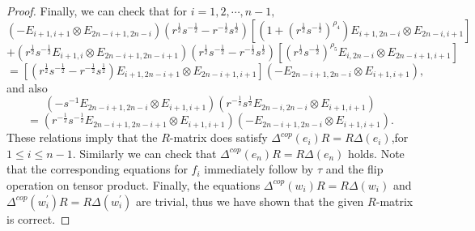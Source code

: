 \documentclass[10pt,a4paper]{amsart}
\begin{document}
\begin{proof}
 Finally, we can check that for $i=1,2, \cdots ,n-1,$
$$
\left(-E_{i+1, i+1} \otimes E_{2 n-i+1,2 n-i}\right)\left(r^{\frac{1}{2}} s^{-\frac{1}{2}}-r^{-\frac{1}{2}} s^{\frac{1}{2}}\right)\left[\left(1+\left(r^{\frac{1}{2}} s^{-\frac{1}{2}}\right)^{\rho_4}\right) E_{i+1,2 n-i} \otimes E_{2 n-i, i+1}\right]
$$
$$
+\left(r^{\frac{1}{2}} s^{-\frac{1}{2}} E_{i+1, i} \otimes E_{2 n-i+1,2 n-i+1}\right)\left(r^{\frac{1}{2}} s^{-\frac{1}{2}}-r^{-\frac{1}{2}} s^{\frac{1}{2}}\right)\left[\left(r^{\frac{1}{2}} s^{-\frac{1}{2}}\right)^{\rho_5} E_{i, 2 n-i} \otimes E_{2 n-i+1, i+1}\right]
$$
$$
=\left[\left(r^{\frac{1}{2}} s^{-\frac{1}{2}}-r^{-\frac{1}{2}} s^{\frac{1}{2}}\right) E_{i+1,2 n-i+1} \otimes E_{2 n-i+1, i+1}\right]\left(-E_{2 n-i+1,2 n-i} \otimes E_{i+1, i+1}\right),
$$
and also
$$
\left(-s^{-1} E_{2 n-i+1,2 n-i} \otimes E_{i+1, i+1}\right)\left(r^{-\frac{1}{2}} s^{\frac{1}{2}} E_{2 n-i, 2 n-i} \otimes E_{i+1, i+1}\right)
$$
$$
=\left(r^{-\frac{1}{2}} s^{-\frac{1}{2}} E_{2 n-i+1,2 n-i+1} \otimes E_{i+1, i+1}\right)\left(-E_{2 n-i+1,2 n-i} \otimes E_{i+1, i+1}\right).
$$
These relations  imply that the $R$-matrix does satisfy $\Delta^{c o p}\left(e_i\right) R=R \Delta\left(e_i\right)$,for $1\leq i\leq n-1$.
Similarly we can check that $
\Delta^{c o p}\left(e_n\right) R=R \Delta\left(e_n\right)$ holds.  Note that the corresponding equations for $f_i$ immediately follow
by $\tau$ and the flip operation on tensor product. Finally, the equations $\Delta^{c o p}\left(w_i\right) R=R \Delta\left(w_i\right)$ and $\Delta^{c o p}\left(w_i^{\prime}\right) R=R \Delta\left(w_i^{\prime}\right)$ are trivial, thus we have shown that the given $R$-matrix is correct.
\end{proof}
\end{document}

